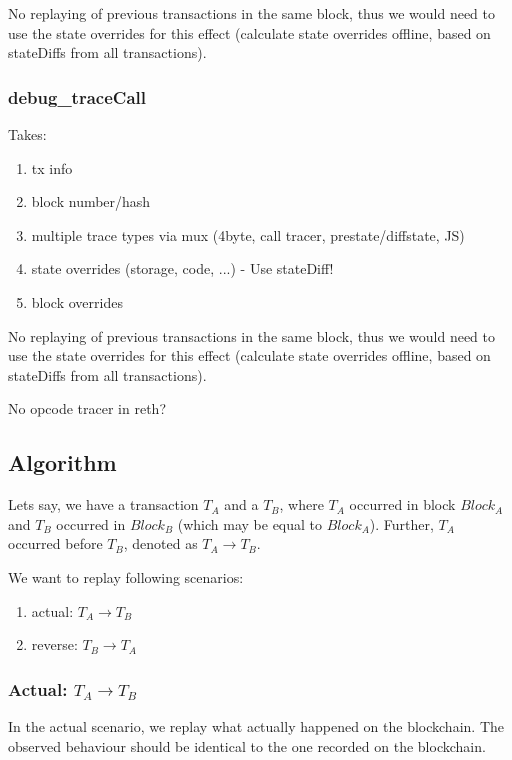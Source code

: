 \documentclass[draft,final]{vutinfth} %
\begin{document}
No replaying of previous transactions in the same block, thus we would need to use the state overrides for this effect (calculate state overrides offline, based on stateDiffs from all transactions).

\subsubsection{debug\_traceCall}

Takes:
\begin{enumerate}
    \item tx info
    \item block number/hash
    \item multiple trace types via mux (4byte, call tracer, prestate/diffstate, JS)
    \item state overrides (storage, code, ...) - Use stateDiff!
    \item block overrides
\end{enumerate}

No replaying of previous transactions in the same block, thus we would need to use the state overrides for this effect (calculate state overrides offline, based on stateDiffs from all transactions).

No opcode tracer in reth?

\subsection{Algorithm}

Lets say, we have a transaction $T_A$ and a $T_B$, where $T_A$ occurred in block $Block_A$ and $T_B$ occurred in $Block_B$ (which may be equal to $Block_A$). Further, $T_A$ occurred before $T_B$, denoted as $T_A \rightarrow T_B$.

We want to replay following scenarios:

\begin{enumerate}
    \item actual: $T_A \rightarrow T_B$
    \item reverse: $T_B \rightarrow T_A$
\end{enumerate}

\subsubsection{Actual: $T_A \rightarrow T_B$}
In the actual scenario, we replay what actually happened on the blockchain. The observed behaviour should be identical to the one recorded on the blockchain.
\end{document}
